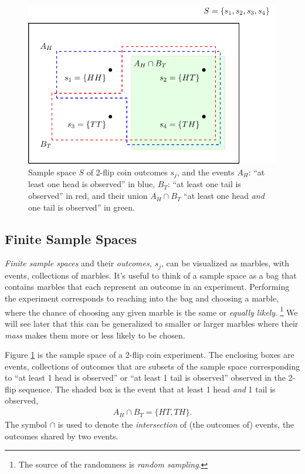 \begin{figure}[h!]
\centering
\includegraphics[width=0.6\linewidth]{tikz/figure1}
\caption{Sample space \(S\) of 2-flip coin outcomes \(s_{j}\), 
and the events \(A_{H}\): ``at least one head is observed'' in blue, 
\(B_{T}\): ``at least one tail is observed'' in red,
and their union \(A_{H} \cap B_{T}\) ``at least one head \emph{and} one tail is observed'' in green.}
\label{fig:coinflip}
\end{figure}

\subsection{Finite Sample Spaces}

\emph{Finite sample spaces} and their \emph{outcomes,} \(s_{j}\), 
can be visualized as marbles, 
with events, 
collections of marbles. 
It's useful to think of a sample space 
as a bag that contains marbles that each represent 
an outcome in an experiment. 
Performing the experiment corresponds to reaching 
into the bag and choosing a marble, 
where the chance of choosing any given marble 
is the same or \emph{equally likely}.%
\footnote{%
The source of the randomness is \emph{random sampling}.} 
We will see later that this can be generalized to smaller 
or larger marbles where their \emph{mass} makes them more or
less likely to be chosen.

Figure \ref{fig:coinflip} is the sample space of a 2-flip coin experiment.
The enclosing boxes are events, 
collections of outcomes that are subsets of the sample 
space corresponding to ``at least 1 head is observed'' or 
``at least 1 tail is observed'' observed in the 2-flip sequence. 
The shaded box is the event that at least 1 head \emph{and} 1 tail is observed,
\begin{align}
A_{H} \cap B_{T} = \{HT, TH\}.
\end{align}
The symbol \(\cap\) is used to denote the \emph{intersection} of (the outcomes of) events,
the outcomes shared by two events.

